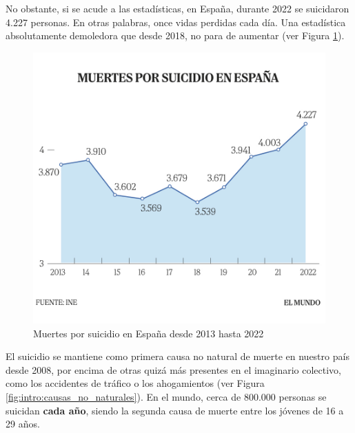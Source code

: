     No obstante, si se acude a las estadísticas, en España, durante 2022 se suicidaron 4.227 personas. En otras palabras, once vidas perdidas cada día. Una estadística absolutamente demoledora que desde 2018, no para de aumentar (ver Figura \ref{fig:intro:muertes_suicidio}).
    
    \begin{figure}[h]
        \centering
        \includegraphics[width=0.66\linewidth]{figures/muertes_suicidio.jpg}
        \caption[Muertes por suicidio en España desde 2013 hasta 2022]{Muertes por suicidio en España desde 2013 hasta 2022 \cite{saiz_4227_2023}}
        \label{fig:intro:muertes_suicidio}
    \end{figure}

    El suicidio se mantiene como primera causa no natural de muerte en nuestro país desde 2008, por encima de otras quizá más presentes en el imaginario colectivo, como los accidentes de tráfico o los ahogamientos (ver Figura \ref{fig:intro:causas_no_naturales}).  En el mundo, cerca de 800.000 personas se suicidan \textbf{cada año}, siendo la segunda causa de muerte entre los jóvenes de 16 a 29 años. \cite{confederacion_salud_mental_espana_salud_nodate}
    
